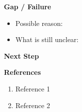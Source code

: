 \documentclass[11pt,a4paper]{ltjsarticle}
\newcommand{\sectionblock}[1]{%
  \vspace{4mm}
  {\large\textbf{#1}}
  \vspace{2mm}

}
\begin{document}
\sectionblock{Gap / Failure}


\begin{itemize}[leftmargin=8mm]
  \item Possible reason:
  \item What is still unclear:
\end{itemize}

\sectionblock{Next Step}



\sectionblock{References}


\begin{enumerate}[leftmargin=8mm]
  \item Reference 1
  \item Reference 2
\end{enumerate}
\end{document}
